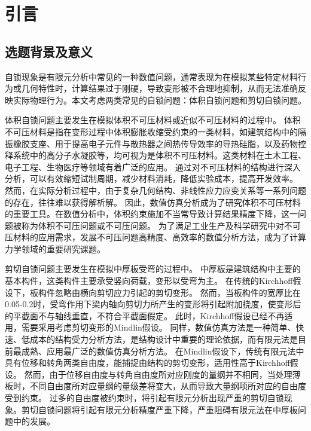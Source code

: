 \chapter{引言}
\section{选题背景及意义}
自锁现象是有限元分析中常见的一种数值问题，通常表现为在模拟某些特定材料行为或几何特性时，计算结果过于刚硬，导致变形被不合理地抑制，从而无法准确反映实际物理行为。本文考虑两类常见的自锁问题：体积自锁问题和剪切自锁问题。

体积自锁问题主要发生在模拟体积不可压材料或近似不可压材料的过程中。
体积不可压材料是指在变形过程中体积膨胀收缩受约束的一类材料，如建筑结构中的隔振橡胶支座、用于提高电子元件与散热器之间热传导效率的导热硅脂，以及药物控释系统中的高分子水凝胶等，均可视为是体积不可压材料。这类材料在土木工程、电子工程、生物医疗等领域有着广泛的应用。
通过对不可压材料的结构进行深入分析，可以有效缩短试制周期，减少材料消耗，降低实验成本，提高开发效率。
然而，在实际分析过程中，由于复杂几何结构、非线性应力应变关系等一系列问题的存在，往往难以获得解析解。
因此，数值仿真分析成为了研究体积不可压材料的重要工具。在数值分析中，体积约束施加不当常导致计算结果精度下降，这一问题被称为体积不可压问题或不可压问题。
为了满足工业生产及科学研究中对不可压材料的应用需求，发展不可压问题高精度、高效率的数值分析方法，成为了计算力学领域的重要研究课题。

剪切自锁问题主要发生在模拟中厚板受弯的过程中。
中厚板是建筑结构中主要的基本构件，这类构件主要承受竖向荷载，变形以受弯为主。
在传统的Kirchhoff假设下，板构件忽略由横向剪切应力引起的剪切变形。
然而，当板构件的宽厚比在0.05-0.2时，受弯作用下梁内轴向剪切力所产生的变形将引起附加挠度，使变形后的平截面不与轴线垂直，不符合平截面假定。
此时，Kirchhoff假设已经不再适用，需要采用考虑剪切变形的Mindlin假设。
同样，数值仿真方法是一种简单、快速、低成本的结构受力分析方法，是结构设计中重要的理论依据，而有限元法\cite{hughes2000}是目前最成熟、应用最广泛的数值仿真分析方法。
在Mindlin假设下，传统有限元法中具有位移和转角两类自由度，能捕捉由结构的剪切变形，适用性高于Kirchhoff假设。
然而，由于位移自由度与转角自由度所对应刚度的量纲并不相同，当处理薄板时，不同自由度所对应量纲的量级差将变大，从而导致大量纲项所对应的自由度受到约束。
过多的自由度被约束时，将引起有限元分析出现严重的剪切自锁现象\cite{arnold1997}。剪切自锁问题将引起有限元分析精度严重下降，严重阻碍有限元法在中厚板问题中的发展。

